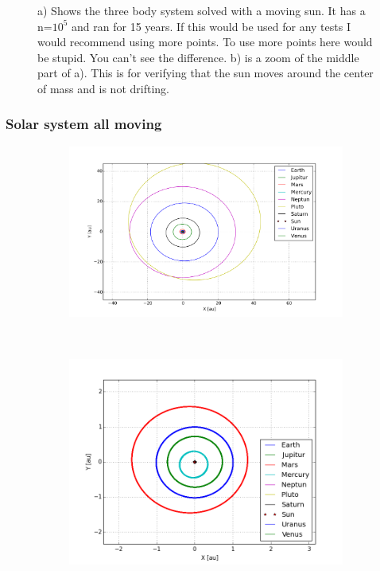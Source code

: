 \begin{figure}[H]
\begin{subfigure}{0.5\textwidth}
        \caption{}
    \end{subfigure}
    \caption{a) Shows the three body system solved with a moving sun. It has a n=$10^5$ and ran for 15 years. If this would be used for any tests I would recommend using more points. To use more points here would be stupid. You can't see the difference. b) is a zoom of the middle part of a). This is for verifying that the sun moves around the center of mass and is not drifting.}
    \label{fig:three-body-moving}
\end{figure}

\subsubsection{Solar system all moving}

\begin{figure}[H]
    \centering
    \begin{subfigure}{0.5\textwidth}
        \centering
        \includegraphics[width=\linewidth]{result/bilder/all-moving-solarsystem.png}
        \caption{}
    \end{subfigure}%
    ~ 
    \begin{subfigure}{0.5\textwidth}
        \centering
        \includegraphics[width=\linewidth]{result/bilder/all-moving-solarsystem-zoom.png}

\end{subfigure}
\end{figure}
